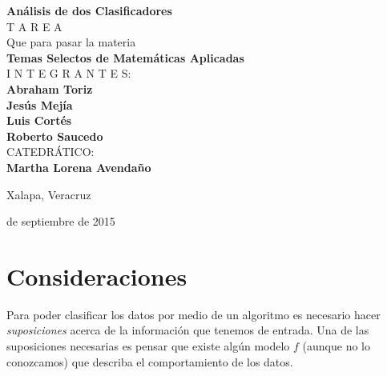 \documentclass[11pt,letterpaper, reqno]{article}
\begin{document}
\vspace{.7cm}
\begin{center}
{\huge \bf
	Análisis de dos Clasificadores
}
\\[1.5cm]
{ \Huge
	T A R E A
}
\\[1.5cm]

{ \large
	Que para pasar la materia
}
\\[.5cm]
{ \LARGE \bf
	Temas Selectos de Matemáticas Aplicadas
}
\\[1.5cm]
{ \Large
I N T E G R A N T E S:
}\\
{ \LARGE \bf
	Abraham Toriz\\
	Jesús Mejía\\
	Luis Cortés\\
	Roberto Saucedo
}\\[1cm]
{ \Large
CATEDRÁTICO:
}\\
{ \LARGE \bf
	Martha Lorena Avendaño
}
\end{center}
\vspace{1.5cm}
\begin{minipage}{.5\textwidth}
\centering
Xalapa, Veracruz
\end{minipage}
\begin{minipage}{.5\textwidth}
 de septiembre de 2015
\end{minipage}

\pagebreak
\pagestyle{plain}

\begin{abstract}
En el afán del ser humano por reducir el esfuerzo para concretar una tarea se han desarrollado técnicas y conocimientos que suplen a la intuicíón. Una de estas tareas es la clasificación de objetos para tomar mejores decisiones. Con tal fin en la matemática, por medio de la estadística, se tienen métodos que permiten aproximar un modelo de clasificación de datos basados en una muestra. En este proyecto estudiamos dos de ellos: el modelo de regresión logística y el modelo de los $n$ vecinos más cercanos.
\end{abstract}

\section{Consideraciones}

Para poder clasificar los datos por medio de un algoritmo es necesario hacer \textit{suposiciones} acerca de la información que tenemos de entrada. Una de las suposiciones necesarias es pensar que existe algún modelo $f$ (aunque no lo conozcamos) que describa el comportamiento de los datos.
\end{document}
